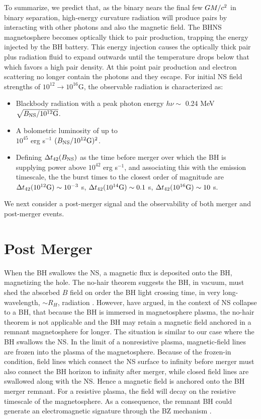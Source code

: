 To summarize, we predict that, as the binary nears the final few
$GM/c^2$ in binary separation, high-energy curvature radiation will
produce pairs by interacting with other photons and also the magnetic
field. The BHNS magnetosphere becomes optically thick to pair
production, trapping the energy injected by the BH battery. This
energy injection causes the optically thick pair plus radiation fluid
to expand outwards until the temperature drops below that which favors
a high pair density. At this point pair production and electron
scattering no longer contain the photons and they escape. For initial
NS field strengths of $10^{12} \rightarrow 10^{16}$G, the observable
radiation is characterized as:
\begin{itemize}
\item Blackbody radiation with a peak photon energy $h \nu \sim$ 0.24
  MeV $\sqrt{B_{\rm NS}/10^{12}\rm{G}}$.
%
\item A bolometric luminosity of up to \\ $10^{45}$ erg s$^{-1}$
  $(B_{\rm NS}/10^{12}\rm{G})^2$.
%
\item Defining $\Delta t_{42}(B_{\rm NS})$ as the time before merger
  over which the BH is supplying power above $10^{42}$ erg s$^{-1}$,
  and associating this with the emission timescale, the the burst
  times to the closest order of magnitude are $\Delta t_{42}(10^{12}
  \rm{G}) \sim 10^{-3}$ s, $\Delta t_{42}(10^{14} \rm{G}) \sim 0.1$ s,
  $\Delta t_{42}(10^{16} \rm{G}) \sim 10$ s.
\end{itemize}
We next consider a post-merger signal and the observability of both
merger and post-merger events.



\section{Post Merger}
\label{Post-Merger}
When the BH swallows the NS, a magnetic flux is deposited onto the BH,
magnetizing the hole. The no-hair theorem suggests the BH, in vacuum,
must shed the absorbed $B$ field on order the BH light crossing time,
in very long-wavelength, $\sim R_{H}$, radiation \citep[{\em
    e.g.},][]{BaumShap:2003}. However, \cite{LyutikovMckinney:2011} have argued, in the context of NS collapse to a BH, that because the BH is immersed in magnetosphere plasma, the no-hair theorem is not applicable and the BH may retain a magnetic field anchored in a remnant magnetosphere for longer. The situation is similar to our case where the BH swallows the NS. In the limit of a nonresistive plasma, magnetic-field lines are frozen into the plasma of the magnetosphere. Because of the frozen-in condition, field lines which connect the NS surface to infinity before merger must also connect the BH horizon to infinity after merger, while closed field lines are swallowed along with the NS.  Hence a magnetic field is anchored onto the BH merger remnant. For a resistive plasma, the field will decay on the resistive timescale of the magnetosphere. As a consequence, the remnant BH could generate an electromagnetic signature through the BZ mechanism \citep{BZ:1977, LyutikovMckinney:2011}.

